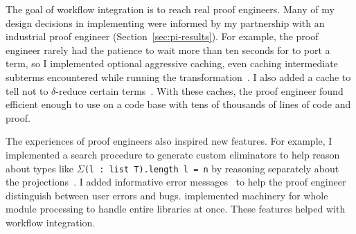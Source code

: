 The goal of workflow integration is to reach real proof engineers.
Many of my design decisions in implementing \toolnamec were informed by my partnership with
an industrial proof engineer (Section~\ref{sec:pi-results}).
For example, the proof engineer rarely had the patience to wait more than ten seconds
for \toolnamec to port a term,
so I implemented optional aggressive caching, even caching intermediate subterms
encountered while running the transformation~\href{https://github.com/uwplse/pumpkin-pi/blob/v2.0.0/plugin/src/cache/caching.ml}{}. %
I also added a cache to tell \toolnamec not to $\delta$-reduce certain terms~\href{https://github.com/uwplse/pumpkin-pi/blob/v2.0.0/plugin/src/cache/caching.ml}{}.
With these caches, the proof engineer found \toolnamec efficient enough to use on a code base with tens of thousands of lines of code and proof.



The experiences of proof engineers also inspired new features.
For example, I implemented a search procedure to generate custom eliminators %
to help reason about types like $\Sigma$\lstinline{(l : list T).length l = n}
by reasoning separately about the projections~\href{https://github.com/uwplse/pumpkin-pi/blob/v2.0.0/plugin/src/automation/search/smartelim.ml}{}. %
I added informative error messages~\href{https://github.com/uwplse/pumpkin-pi/blob/v2.0.0/plugin/src/lib/ornerrors.ml}{} to help the proof engineer distinguish between user errors and bugs. %
 implemented machinery for whole module processing to handle entire libraries at once.
These features helped with workflow integration. %


